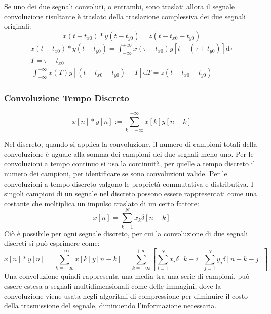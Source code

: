 \documentclass{article}
\newcommand{\df}{\mathrm{d}}
\numberwithin{equation}{subsection}
\begin{document}
Se uno dei due segnali convoluti, o entrambi, sono traslati allora il segnale convoluzione risultante è traslato della traslazione complessiva dei due segnali originali:
\begin{equation}
    x(t-t_{x0})*y(t-t_{y0})=z(t-t_{x0}-t_{y0})
\end{equation}
\begin{gather*}
    x(t-t_{x0})*y(t-t_{y0})=\displaystyle\int_{-\infty}^{+\infty}x(\tau-t_{x0})y[t-(\tau+t_{y0})]\df\tau\\
    {T=\tau-t_{x0}}\\\
    \int_{-\infty}^{+\infty}x(T)y[(t-t_{x0}-t_{y0})+T]\df T=z(t-t_{x0}-t_{y0})
\end{gather*}

\subsubsection{Convoluzione Tempo Discreto}

\begin{equation}
    x[n]*y[n]:=\displaystyle\sum_{k=-\infty}^{+\infty}x[k]y[n-k]
\end{equation}

Nel discreto, quando si applica la convoluzione, il numero di campioni totali della convoluzione è uguale alla somma dei campioni dei due segnali meno uno. Per le convoluzioni 
a tempo continuo si usa la continuità, per quelle a tempo discreto il numero dei campioni, per identificare se sono convoluzioni valide. Per le convoluzioni a tempo discreto valgono le proprietà 
commutativa e distributiva. I singoli campioni di un segnale nel discreto possono essere rappresentati come una costante che moltiplica un impulso traslato di un certo fattore:
\begin{equation*}
    x[n]=\displaystyle\sum_{k=1}^Nx_k\delta[n-k]
\end{equation*}
Ciò è possibile per ogni segnale discreto, per cui la convoluzione di due segnali discreti si può esprimere come:
\begin{equation*}
    x[n]*y[n]=\displaystyle\sum_{k=-\infty}^{+\infty}x[k]y[n-k]=\sum_{k=-\infty}^{+\infty}\left[\sum_{i=1}^Nx_i\delta[k-i]\sum_{j=1}^Ny_j\delta[n-k-j]\right]
\end{equation*}
Una convoluzione quindi rappresenta una media tra una serie di campioni, può essere estesa a segnali multidimensionali come delle immagini, dove la convoluzione viene 
usata negli algoritmi di compressione per diminuire il costo della trasmissione del segnale, diminuendo l'informazione necessaria. 
\end{document}
